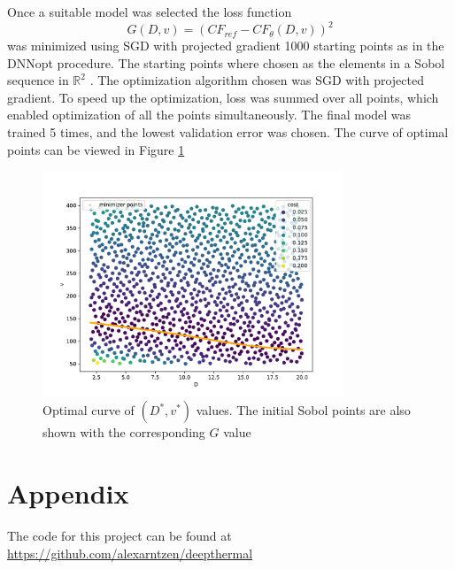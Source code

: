 \documentclass[a4paper]{article}
\newcommand{\R}{\mathbb{R}}
\begin{document}
Once a suitable model was selected the loss function
\begin{equation}
	G(D,v) = (CF_{ref}- CF_{\theta}(D,v))^2
\end{equation}
was minimized using SGD with projected gradient 1000 starting points as in the DNNopt\cite{Lye_2021} procedure. The starting points where chosen as the elements in a Sobol sequence in $\R^2$ . The optimization algorithm chosen was SGD with projected gradient. To speed up the optimization, loss was summed over all points, which enabled optimization of all the points simultaneously. The final model was trained 5 times, and the lowest validation error was chosen. The curve of optimal points can be viewed in Figure \ref{fig:task5}

\begin{figure}[t]
    \centering
    \includegraphics[width=0.8\textwidth]{figures/task5/final_optim_points.pdf}
    \caption{Optimal curve of $(D^*,v^*)$ values. The initial Sobol points are also shown with the corresponding $G$ value}
    \label{fig:task5}
\end{figure}

\section*{Appendix}
The code for this project can be found at \url{https://github.com/alexarntzen/deepthermal}

\FloatBarrier
\printbibliography
\end{document}
